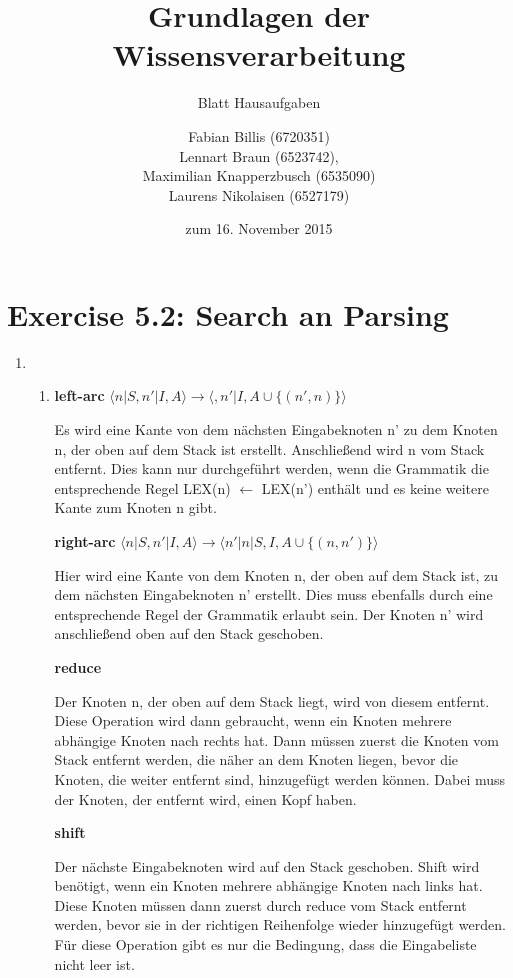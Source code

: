 \documentclass[a4paper]{scrartcl}
\title{Grundlagen der Wissensverarbeitung}
\subtitle{Blatt {\blattnr} Hausaufgaben}
\author{
    Fabian Billis (6720351) \\
    Lennart Braun (6523742), \\
    Maximilian Knapperzbusch (6535090) \\
    Laurens Nikolaisen (6527179) \\
}
\date{zum 16. November 2015}
\def \blattnr {5}
\begin{document}
\maketitle

\section*{Exercise \blattnr.2: Search an Parsing}

\begin{enumerate}
    \item
        \begin{enumerate}[label=(\alph*)]
            \item
            
            {
            
            \textbf{left-arc}   $\langle n|S,n'|I,A\rangle \rightarrow \langle,n'|I,A \cup \{(n',n)\}\rangle$
            
            Es wird eine Kante von dem nächsten Eingabeknoten n' zu dem Knoten n, der oben auf dem Stack ist erstellt.
            Anschließend wird n vom Stack entfernt. Dies kann nur durchgeführt werden, wenn die Grammatik die entsprechende Regel LEX(n) $\leftarrow$ LEX(n') enthält und es keine weitere Kante zum Knoten n gibt. 
            
            \textbf{right-arc} $\langle n |S, n' | I, A \rangle \rightarrow \langle n'|n|S, I, A \cup \{(n, n')\}\rangle$ 
            
            
            Hier wird eine Kante von dem Knoten n, der oben auf dem Stack ist, zu dem nächsten Eingabeknoten n' erstellt.
            Dies muss ebenfalls durch eine entsprechende Regel der Grammatik erlaubt sein. Der Knoten n' wird anschließend oben auf den Stack geschoben.
            
            \textbf{reduce}
            
            Der Knoten n, der oben auf dem Stack liegt, wird von diesem entfernt. Diese Operation wird dann gebraucht, wenn ein Knoten mehrere abhängige Knoten nach rechts hat. Dann müssen zuerst die Knoten vom Stack entfernt werden, die näher an dem Knoten  liegen, bevor die Knoten, die weiter entfernt sind, hinzugefügt werden können. Dabei muss der Knoten, der entfernt wird, einen Kopf haben.
            
            \textbf{shift}
            
            Der nächste Eingabeknoten wird auf den Stack geschoben. Shift wird benötigt, wenn ein Knoten mehrere abhängige Knoten nach links hat. Diese Knoten müssen dann zuerst durch reduce vom Stack entfernt werden, bevor sie in der richtigen Reihenfolge wieder hinzugefügt werden. Für diese Operation gibt es nur die Bedingung, dass die Eingabeliste nicht leer ist.
        }
			

\end{enumerate}
\end{enumerate}
\end{document}
